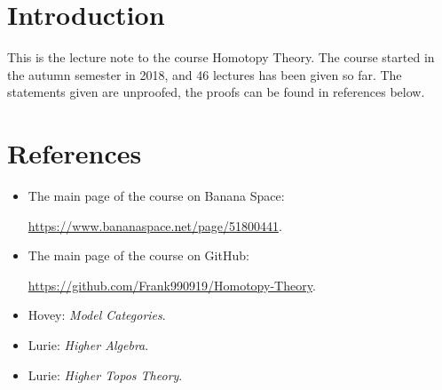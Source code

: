 \section*{Introduction}

This is the lecture note to the course Homotopy Theory. 
The course started in the autumn semester in 2018, and 46 lectures has been given so far.
The statements given are unproofed, the proofs can be found in references below.

\section*{References}

\begin{itemize}
\item The main page of the course on Banana Space: 

\url{https://www.bananaspace.net/page/51800441}.
\item The main page of the course on GitHub: 

\url{https://github.com/Frank990919/Homotopy-Theory}.
\item Hovey: \textit{Model Categories}.
\item Lurie: \textit{Higher Algebra}.
\item Lurie: \textit{Higher Topos Theory}.
\end{itemize}